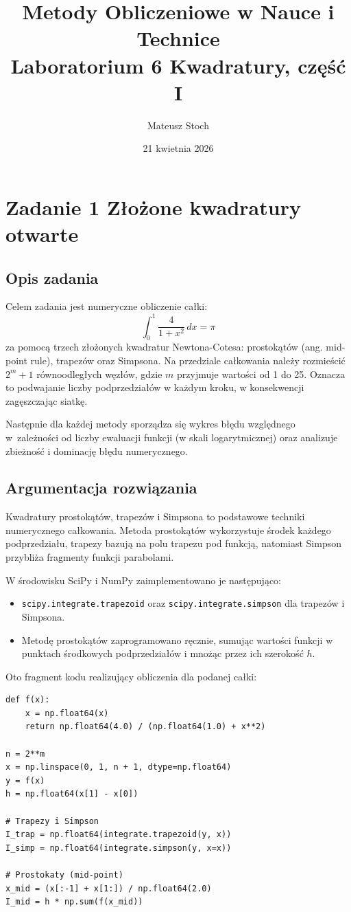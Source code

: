 \documentclass[12pt, a4paper]{article}
\title{
  \textbf{Metody Obliczeniowe w Nauce i Technice} \\[0.5em]
  \large Laboratorium 6 \textendash{} Kwadratury, część I
}
\author{Mateusz Stoch}
\date{21 kwietnia 2026}
\begin{document}
\maketitle

\section{Zadanie 1 \textendash{} Złożone kwadratury otwarte}

\subsection{Opis zadania}

Celem zadania jest numeryczne obliczenie całki:
\[
  \int_0^1 \frac{4}{1+x^2}\, dx = \pi
\]
za pomocą trzech złożonych kwadratur Newtona-Cotesa: prostokątów (ang. mid-point rule), trapezów oraz Simpsona. Na przedziale całkowania należy rozmieścić $2^m + 1$ równoodległych węzłów, gdzie $m$ przyjmuje wartości od 1 do 25. Oznacza to podwajanie liczby podprzedziałów w każdym kroku, w konsekwencji zagęszczając siatkę.

Następnie dla każdej metody sporządza się wykres błędu względnego w~zależności od liczby ewaluacji funkcji (w skali logarytmicznej) oraz analizuje zbieżność i dominację błędu numerycznego.

\subsection{Argumentacja rozwiązania}

Kwadratury prostokątów, trapezów i Simpsona to podstawowe techniki numerycznego całkowania. Metoda prostokątów wykorzystuje środek każdego podprzedziału, trapezy bazują na polu trapezu pod funkcją, natomiast Simpson przybliża fragmenty funkcji parabolami.

W środowisku SciPy i NumPy zaimplementowano je następująco:
\begin{itemize}
    \item \texttt{scipy.integrate.trapezoid} oraz \texttt{scipy.integrate.simpson} dla trapezów i Simpsona.
    \item Metodę prostokątów zaprogramowano ręcznie, sumując wartości funkcji w punktach środkowych podprzedziałów i mnożąc przez ich szerokość $h$.
\end{itemize}

Oto fragment kodu realizujący obliczenia dla podanej całki:
\begin{lstlisting}[caption={Wyznaczanie całki za pomocą kwadratur złożonych}]
def f(x):
    x = np.float64(x)
    return np.float64(4.0) / (np.float64(1.0) + x**2)

n = 2**m
x = np.linspace(0, 1, n + 1, dtype=np.float64)
y = f(x)
h = np.float64(x[1] - x[0])

# Trapezy i Simpson
I_trap = np.float64(integrate.trapezoid(y, x))
I_simp = np.float64(integrate.simpson(y, x=x))

# Prostokaty (mid-point)
x_mid = (x[:-1] + x[1:]) / np.float64(2.0)
I_mid = h * np.sum(f(x_mid))
\end{lstlisting}
\end{document}
